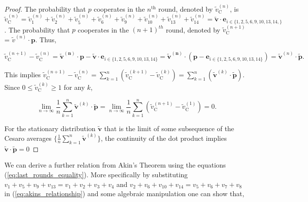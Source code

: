 \documentclass{article}
\theoremstyle{definition}
\begin{document}
\begin{proof}
  The probability that \(p\) cooperates in the \(n^{\text{th}}\) round, denoted
  by \(\tilde{v}_{\text{C}}^{(n)}\), is \(\tilde{v}_{\text{C}}^{(n)} = \tilde{v}_{1}^{(n)} +
  \tilde{v}_{2}^{(n)} + \tilde{v}_{5}^{(n)} + \tilde{v}_{6}^{(n)} + \tilde{v}_{9}^{(n)} +  \tilde{v}_{10}^{(n)} +
  \tilde{v}_{13}^{(n)} + \tilde{v}_{14}^{(n)} = \mathbf{\tilde{v}} \cdot \mathbf{e}_{i \in \{1, 2,
  5, 6, 9, 10, 13, 14,\}}\). The probability that \(p\) cooperates in the
  \((n + 1)^{th}\) round, denoted by \(\tilde{v}_{\text{C}}^{(n + 1)}\) = \(\tilde{v}^{(n)} \cdot \mathbf{p}\).
  Thus,

  \begin{equation*}
   \tilde{v}_{\text{C}}^{(n + 1)} - \tilde{v}_{\text{C}}^{(n)} = \mathbf{\tilde{v}^{(n)}} \cdot \mathbf{p} - \mathbf{\tilde{v}} \cdot \mathbf{e}_{i \in \{1, 2,
    5, 6, 9, 10, 13, 14\}} = \mathbf{\tilde{v}^{(n)}} \cdot (\mathbf{p} - \mathbf{e}_{i \in \{1, 2,
    5, 6, 9, 10, 13, 14\}}) = \mathbf{\tilde{v}}^{(n)} \cdot \mathbf{\tilde{p}}.
  \end{equation*}

  This implies \(\tilde{v}_{\text{C}}^{(n + 1)} - \tilde{v}_{\text{C}}^{(n)}
  = \sum_{k=1}^{n} (\tilde{v}_{\text{C}}^{(k + 1)} - \tilde{v}_{\text{C}}^{(k)})
  = \sum_{k=1}^{n} (\mathbf{\tilde{v}}^{(k)} \cdot \mathbf{\tilde{p}})\). Since
  \(0 \leq \tilde{v}_{\text{C}}^{(k)} \geq 1\) for any \(k\),

  \begin{equation}\label{eq:akins_relationship}
    \lim_{n \rightarrow \infty} \frac{1}{n} \sum_{k=1}^{n} \mathbf{\tilde{v}}^{(k)} \cdot \mathbf{\tilde{p}} = 
    \lim_{n \rightarrow \infty} \frac{1}{n} \sum_{k=1}^{n} (\tilde{v}_{\text{C}}^{(n + 1)} - \tilde{v}_{\text{C}}^{(1)}) = 0.
  \end{equation}

  For the stationary distribution \(\mathbf{\tilde{v}}\) that is the limit of
  some subsequence of the Cesaro averages \(\{\frac{1}{n} \sum_{k=1}^{n} \mathbf{\tilde{v}}^{(k)}\}\),
  the continuity of the dot product implies \(\mathbf{\tilde{v}} \cdot \mathbf{\tilde{p}} = 0 \)

\end{proof}

We can derive a further relation from Akin's Theorem using the equations
(\ref{eq:last_rounds_equality}). More specifically by substituting \(v_{1} +
v_{5} + v_{9} + v_{13} = v_{1} +
v_{2} + v_{3} + v_{4} \) and \(v_{2} + v_{6} + v_{10} + v_{14} =
v_{5} + v_{6} + v_{7} + v_{8} \) in (\ref{eq:akins_relationship}) and some
algebraic manipulation one can show that,
\end{document}
